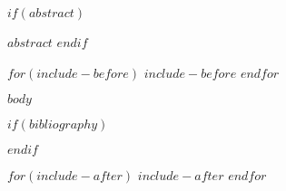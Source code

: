 \documentclass[
$if(fontsize)$
$fontsize$,
$endif$
$if(lang)$
$babel-lang$,
$endif$
$for(classoption)$
$classoption$$sep$,
$endfor$
a4paper]{article}
\renewenvironment{abstract}
 {\small
  \begin{flushleft}
  \bfseries \abstractname\vspace{-0.5em}\vspace{0pt}
  \end{flushleft}
  \list{}{
    \setlength{\leftmargin}{.0cm}
    \setlength{\rightmargin}{\leftmargin}
  }
  \item\relax}
 {\endlist}
\begin{document}
\begin{center}
  \begin{minipage}{19cm}
  \end{minipage}\hfill
\end{center}

$if(abstract)$
\begin{abstract}
$abstract$
\end{abstract}
$endif$


$for(include-before)$
  $include-before$
$endfor$


$body$

\clearpage

$if(bibliography)$
  
  
$endif$


$for(include-after)$
  $include-after$
$endfor$
\end{document}
